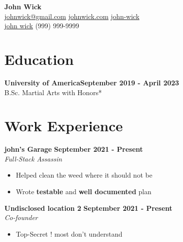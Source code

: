 \documentclass[letterpaper, 11pt]{article}
\newcommand{\iconSpace}{\hspace{1px}}
\newcommand{\bulletSpace}{\vspace{-8pt}}
\newcommand{\hSpace}{\hspace{8px}}
\newcommand{\secStartSpace}{\vspace{3pt}}
\newcommand{\secEndSpace}{\vspace{5pt}}
\newcommand{\spaceCollapse}{\vspace{-5pt}}
\newcommand{\workHeader}[3]{
\noindent \textbf{#1} \hfill \textbf{#3}\\
	\textit{#2}
}
\begin{document}
\begin{center} 
	{\Large \textbf{John Wick}}\\
	\vspace{1px}
	{\footnotesize
		 \href{mailto:john@wick.com}{johnwick@gmail.com} 
		\hSpace
		 \iconSpace \href{johnwick.com}{johnwick.com} 
		\hSpace 
		 \hspace{.1px} \href{https://www.linkedin.com/in/john-wick/}{john-wick} 
		\hSpace
		}\\
	{\footnotesize
		 \iconSpace \href{https://github.com/john-wick}{john wick}
		\hSpace 
		 \iconSpace
		(999) 999-9999
	}
\end{center}
\spaceCollapse


\section{\color{red} \textbf{Education}}
\secStartSpace

\begin{addmargin}[1em]{1em}
	\textbf{University of America}\hfill \textbf{September 2019 - April 2023}\\
	\setlength\parindent{1cm} B.Sc. Martial Arts with Honors*
\end{addmargin}
\secEndSpace


\section{\color{red} \textbf{Work Experience}}
\secStartSpace

\begin{addmargin}[1em]{1em}
		
	\noindent \textbf{john's Garage} \hfill \textbf{September 2021 - Present}\\
	\textit{Full-Stack Assassin}
	\spaceCollapse
	\begin{itemize}
		\item Helped clean the weed where it should not be
		      \bulletSpace
		\item Wrote \textbf{testable} and \textbf{well documented} plan
	\end{itemize}
		
	\workHeader{Undisclosed location 2}{Co-founder}{September 2021 - Present} 
	\spaceCollapse
	\begin{itemize}
		\item Top-Secret ! most don't understand
	\end{itemize}
\end{addmargin}
\secEndSpace
\end{document}
